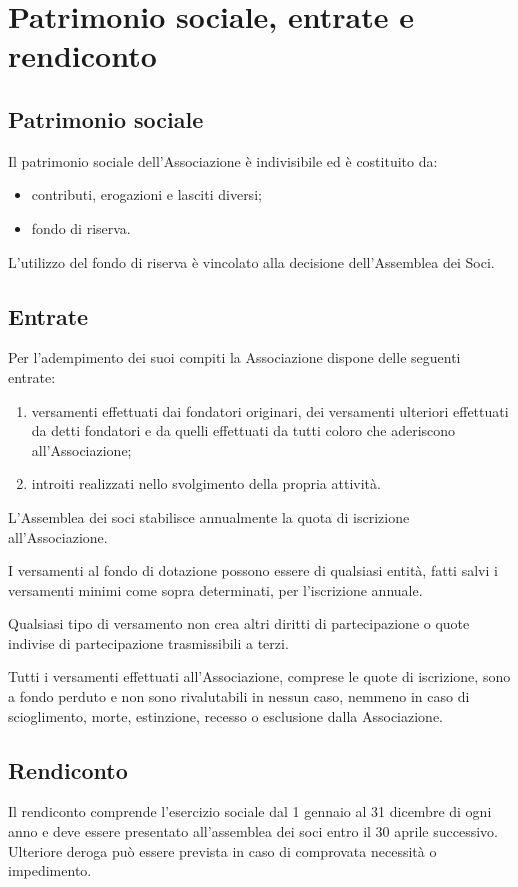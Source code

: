 \documentclass[a4paper,11pt,oneside]{article}
\begin{document}
\section{Patrimonio sociale, entrate e rendiconto}

\subsection{Patrimonio sociale}
Il patrimonio sociale dell'Associazione è indivisibile ed è costituito da:

\begin{itemize}
 \item  contributi, erogazioni e lasciti diversi; 
 \item  fondo di riserva. 
\end{itemize}

L'utilizzo del fondo di riserva è vincolato alla decisione dell'Assemblea dei Soci.

\subsection{Entrate}

Per l'adempimento dei suoi compiti la Associazione dispone delle seguenti entrate:

\begin{enumerate}
\item versamenti effettuati dai fondatori originari, dei versamenti ulteriori effettuati da detti fondatori e da quelli effettuati da tutti coloro che aderiscono all'Associazione;
\item introiti realizzati nello svolgimento della propria attività.
\end{enumerate}

L'Assemblea dei soci stabilisce annualmente la quota di iscrizione all'Associazione. 

I versamenti al fondo di dotazione possono essere di qualsiasi entità, fatti salvi i versamenti minimi come sopra determinati, per l'iscrizione annuale. 

Qualsiasi tipo di versamento non crea altri diritti di partecipazione o quote indivise di partecipazione trasmissibili a terzi.

Tutti i versamenti effettuati all'Associazione, comprese le quote di iscrizione, sono a fondo perduto e non sono rivalutabili in nessun caso, nemmeno in caso di scioglimento, morte, estinzione, recesso o esclusione dalla Associazione.

\subsection{Rendiconto}
Il rendiconto comprende l'esercizio sociale dal 1 gennaio al 31 dicembre di ogni anno e deve essere presentato all'assemblea dei soci entro il 30 aprile
successivo. Ulteriore deroga può essere prevista in caso di comprovata necessità o impedimento.
\end{document}
